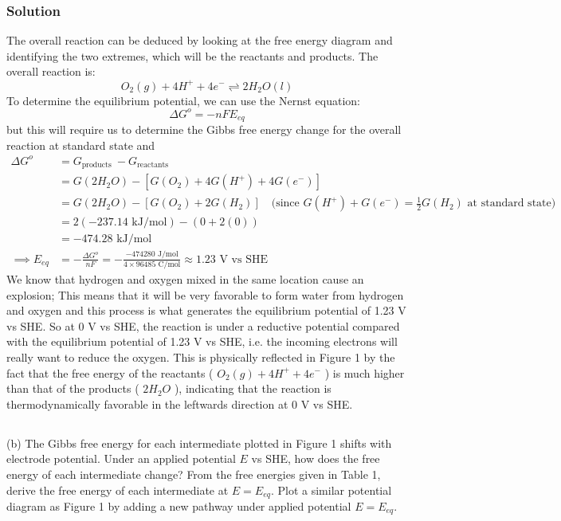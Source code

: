 \documentclass[12pt]{article}
\begin{document}
\subsubsection{Solution}
The overall reaction can be deduced by looking at the free energy diagram and identifying the two extremes, which will be the reactants and products. The overall reaction is:
\begin{equation}
O_{2}(g)+4 H^{+}+4 e^{-} \rightleftharpoons 2 H_{2} O(l)
\end{equation}
To determine the equilibrium potential, we can use the Nernst equation:
\begin{equation}
\Delta G^{o}=-n F E_{e q}
\end{equation}
but this will require us to determine the Gibbs free energy change for the overall reaction at standard state and
\begin{align}
\Delta G^{o}&=G_{\text {products }}-G_{\text {reactants }}\\
&=G\left(2 H_{2} O\right)-\left[G\left(O_{2}\right) +4 G\left(H^{+}\right)+4 G\left(e^{-}\right)\right]\\
&=G\left(2 H_{2} O\right)-\left[G\left(O_{2}\right) +2 G\left(H_{2}\right)\right] \quad \text{(since } G\left(H^{+}\right)+G\left(e^{-}\right)=\frac{1}{2} G\left(H_{2}\right) \text{ at standard state)}\\
&=2(-237.14 \text{ kJ/mol}) - (0 + 2(0)) \\
&=-474.28 \text{ kJ/mol}\\
\implies E_{e q}&=-\frac{\Delta G^{o}}{n F} = -\frac{-474280 \text{ J/mol}}{4 \times 96485 \text{ C/mol}} \approx 1.23 \text{ V vs SHE}
\end{align}
We know that hydrogen and oxygen mixed in the same location cause an explosion; This means that it will be very favorable to form water from hydrogen and oxygen and this process is what generates the equilibrium potential of 1.23 V vs SHE. So at 0 V vs SHE, the reaction is under a reductive potential compared with the equilibrium potential of 1.23 V vs SHE, i.e. the incoming electrons will really want to reduce the oxygen. 
This is physically reflected in Figure 1 by the fact that the free energy of the reactants ( $O_{2}(g)+4 H^{+}+4 e^{-}$ ) is much higher than that of the products ( $2 H_{2} O$ ), indicating that the reaction is thermodynamically favorable in the leftwards direction at 0 V vs SHE.     
\subsection{}
(b) The Gibbs free energy for each intermediate plotted in Figure 1 shifts with electrode potential. Under an applied potential $E$ vs SHE, how does the free energy of each intermediate change? From the free energies given in Table 1, derive the free energy of each intermediate at $E=E_{e q}$. Plot a similar potential diagram as Figure 1 by adding a new pathway under applied potential $E=E_{e q}$.\\
\end{document}

